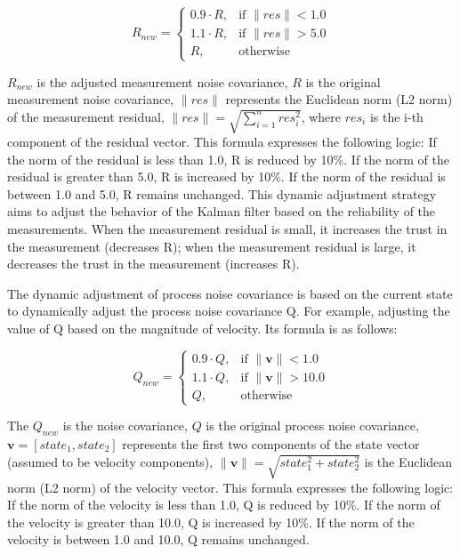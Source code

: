 \begin{equation}
R_{new} = \begin{cases}
0.9 \cdot R, & \text{if } \|res\| < 1.0 \\
1.1 \cdot R, & \text{if } \|res\| > 5.0 \\
R, & \text{otherwise}
\end{cases}
\label{eq:R}
\end{equation}

\(R_{new}\) is the adjusted measurement noise covariance, \(R\) is the original measurement noise covariance, \(\|res\|\) represents the Euclidean norm (L2 norm) of the measurement residual, \(\|res\| = \sqrt{\sum_{i=1}^n res_i^2}\), where \(res_i\) is the i-th component of the residual vector. This formula expresses the following logic:
If the norm of the residual is less than 1.0, R is reduced by 10\%. If the norm of the residual is greater than 5.0, R is increased by 10\%. If the norm of the residual is between 1.0 and 5.0, R remains unchanged. This dynamic adjustment strategy aims to adjust the behavior of the Kalman filter based on the reliability of the measurements. When the measurement residual is small, it increases the trust in the measurement (decreases R); when the measurement residual is large, it decreases the trust in the measurement (increases R).

The dynamic adjustment of process noise covariance is based on the current state to dynamically adjust the process noise covariance Q. For example, adjusting the value of Q based on the magnitude of velocity. Its formula is as follows:



\begin{equation}
Q_{new} = \begin{cases}
0.9 \cdot Q, & \text{if } \|\mathbf{v}\| < 1.0 \\
1.1 \cdot Q, & \text{if } \|\mathbf{v}\| > 10.0 \\
Q, & \text{otherwise}
\end{cases}
\label{eq:Q}
\end{equation}

The \(Q_{new}\) is the noise covariance, \(Q\) is the original process noise covariance, \(\mathbf{v} = [state_1, state_2]\) represents the first two components of the state vector (assumed to be velocity components), \(\|\mathbf{v}\| = \sqrt{state_1^2 + state_2^2}\) is the Euclidean norm (L2 norm) of the velocity vector.
This formula expresses the following logic: If the norm of the velocity is less than 1.0, Q is reduced by 10\%. If the norm of the velocity is greater than 10.0, Q is increased by 10\%. If the norm of the velocity is between 1.0 and 10.0, Q remains unchanged.

